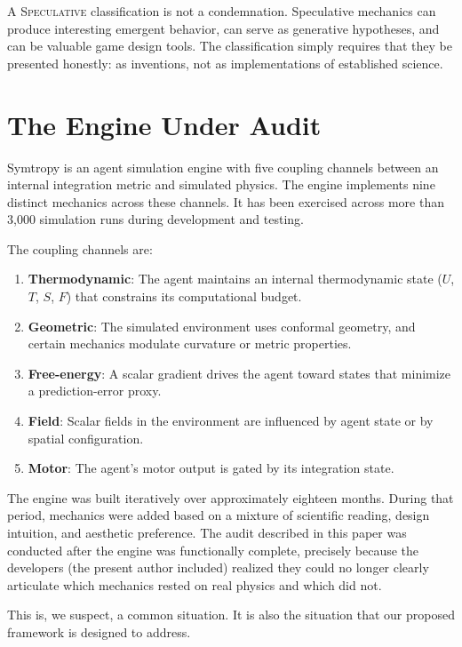 \documentclass[12pt,a4paper]{article}
\begin{document}
A \textsc{Speculative} classification is not a condemnation.
Speculative mechanics can produce interesting emergent behavior,
can serve as generative hypotheses, and can be valuable game
design tools.  The classification simply requires that they be
presented honestly: as inventions, not as implementations of
established science.


\section{The Engine Under Audit}
\label{sec:engine}

Symtropy is an agent simulation engine with five coupling
channels between an internal integration metric and simulated
physics.  The engine implements nine distinct mechanics across
these channels.  It has been exercised across more than 3,000
simulation runs during development and testing.

The coupling channels are:

\begin{enumerate}
  \item \textbf{Thermodynamic}: The agent maintains an internal
    thermodynamic state ($U$, $T$, $S$, $F$) that constrains
    its computational budget.
  \item \textbf{Geometric}: The simulated environment uses
    conformal geometry, and certain mechanics modulate curvature
    or metric properties.
  \item \textbf{Free-energy}: A scalar gradient drives the agent
    toward states that minimize a prediction-error proxy.
  \item \textbf{Field}: Scalar fields in the environment are
    influenced by agent state or by spatial configuration.
  \item \textbf{Motor}: The agent's motor output is gated by
    its integration state.
\end{enumerate}

The engine was built iteratively over approximately eighteen
months.  During that period, mechanics were added based on a
mixture of scientific reading, design intuition, and aesthetic
preference.  The audit described in this paper was conducted
after the engine was functionally complete, precisely because the
developers (the present author included) realized they could no
longer clearly articulate which mechanics rested on real physics
and which did not.

This is, we suspect, a common situation.  It is also the
situation that our proposed framework is designed to address.
\end{document}
